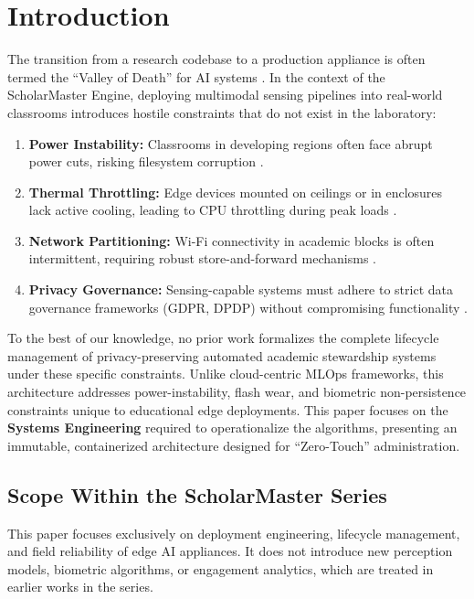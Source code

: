 \documentclass[conference]{IEEEtran}
\begin{document}
\section{Introduction}
The transition from a research codebase to a production appliance is often termed the ``Valley of Death'' for AI systems \cite{b11}. In the context of the ScholarMaster Engine, deploying multimodal sensing pipelines into real-world classrooms introduces hostile constraints that do not exist in the laboratory:
\begin{enumerate}
    \item \textbf{Power Instability:} Classrooms in developing regions often face abrupt power cuts, risking filesystem corruption \cite{b25}.
    \item \textbf{Thermal Throttling:} Edge devices mounted on ceilings or in enclosures lack active cooling, leading to CPU throttling during peak loads \cite{b12}.
    \item \textbf{Network Partitioning:} Wi-Fi connectivity in academic blocks is often intermittent, requiring robust store-and-forward mechanisms \cite{b16}.
    \item \textbf{Privacy Governance:} Sensing-capable systems must adhere to strict data governance frameworks (GDPR, DPDP) without compromising functionality \cite{b9}.
\end{enumerate}

To the best of our knowledge, no prior work formalizes the complete lifecycle management of privacy-preserving automated academic stewardship systems under these specific constraints. Unlike cloud-centric MLOps frameworks, this architecture addresses power-instability, flash wear, and biometric non-persistence constraints unique to educational edge deployments. This paper focuses on the \textbf{Systems Engineering} required to operationalize the algorithms, presenting an immutable, containerized architecture designed for ``Zero-Touch'' administration.

\subsection{Scope Within the ScholarMaster Series}
This paper focuses exclusively on deployment engineering, lifecycle management, and field reliability of edge AI appliances. It does not introduce new perception models, biometric algorithms, or engagement analytics, which are treated in earlier works in the series.

\end{document}
